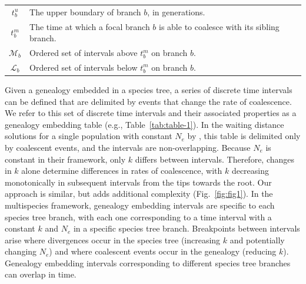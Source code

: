 \documentclass[11pt]{article}
\begin{document}
\begin{table}[!b]
\begin{tabular}[t]{ |c|l| }
	$t_b^u$        & The upper boundary of branch $b$, in generations. \\
	$t_b^m$        & The time at which a focal branch $b$ is able to coalesce with its sibling branch. \\
	$\mathcal{M}_b$  & Ordered set of intervals above $t_b^m$ on branch $b$.\\
	$\mathcal{L}_b$  & Ordered set of intervals below $t_b^m$ on branch $b$.\\	
	\bottomrule
\end{tabular}
\end{table}






Given a genealogy embedded in a species tree, a series of discrete
time intervals can be defined that are delimited 
by events that change the rate of coalescence. 
We refer to this 
set of discrete time intervals and their associated properties
as a genealogy embedding table (e.g., Table~\ref{tab:table-1}). 
In the waiting distance solutions for a single population with constant $N_e$ 
by \citet{deng_distribution_2021}, this table is delimited only by coalescent 
events, and the intervals are non-overlapping. 
Because $N_e$ is constant in their framework, only $k$ differs between 
intervals. Therefore, changes in $k$ alone determine differences in rates of coalescence, 
with $k$ decreasing monotonically in subsequent intervals from the tips towards the root. 
Our approach is similar, but adds additional complexity (Fig.~\ref{fig:fig1}). 
In the multispecies framework, genealogy embedding intervals are specific to each 
species tree branch, with each one corresponding to a time interval with a constant 
$k$ and $N_e$ in a specific species tree branch. 
Breakpoints between intervals arise where divergences 
occur in the species tree (increasing $k$ and potentially changing $N_e$) 
and where coalescent events occur in the genealogy (reducing $k$). 
Genealogy embedding intervals corresponding to different species tree 
branches can overlap in time.
\end{document}
